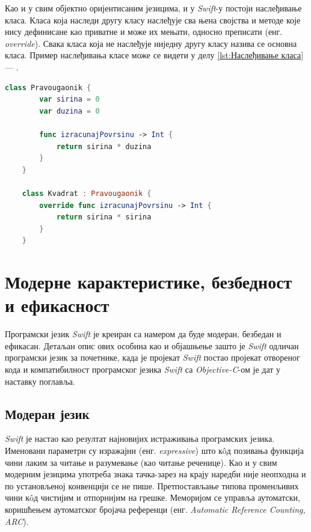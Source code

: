 \documentclass[12pt,oneside]{memoir}
\begin{document}
\indent Као и у свим објектно оријентисаним језицима, и у \textit{Swift}-у постоји наслеђивање класа. Класа која наследи другу класу наслеђује сва њена својства и методе које нису дефинисане као приватне и може их мењати, односно преписати (енг. \textit{override}). Свака класа која не наслеђује ниједну другу класу назива се основна класа. Пример наслеђивања класе може се видети у делу \ref{lst:Наслеђивање класа} --- .

\begin{lstlisting}[caption=\textit{{Наслеђивање класа}}, label={lst:Наслеђивање класа}, language=Swift, frame=single]
    class Pravougaonik {
        var sirina = 0
        var duzina = 0
        
        func izracunajPovrsinu -> Int {
            return sirina * duzina
        }
    }
    
    class Kvadrat : Pravougaonik {
        override func izracunajPovrsinu -> Int {
            return sirina * sirina
        }
    }
\end{lstlisting}

\section{Модерне карактеристике, безбедност и ефикасност}

\indent Програмски језик \textit{Swift} је креиран са намером да буде модеран, безбедан и ефикасан. Детаљан опис ових особина као и објашњење зашто је \textit{Swift} одличан програмски језик за почетнике, када је пројекат \textit{Swift} постао пројекат отвореног кода и компатибилност програмског језика \textit{Swift} са \textit{Objective-C}-ом је дат у наставку поглавља. 

\subsection{Модеран језик}
\label{sec:Модеран}

\indent \textit{Swift} је настао као резултат најновијих истраживања програмских језика.
Именовани параметри су изражајни (енг. \textit{expressive}) што к\^{o}д позивања функција чини лаким за читање и разумевање (као читање реченице). Као и у свим модерним језицима употреба знака тачка-зарез на крају наредби није неопходна и по установљеној конвенцији се не пише. Претпостављање типова променљивих чини к\^{o}д чистијим и отпорнијим на грешке. Меморијом се управља аутоматски, коришћењем аутоматског бројача референци (енг. \textit{Automatic Reference Counting, ARC}).
\end{document}
